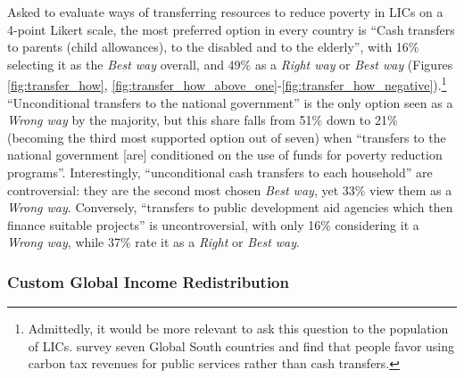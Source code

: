 \documentclass[12pt,english]{article}
\begin{document}
\begin{bibunit}
Asked to evaluate ways of transferring resources to reduce poverty in LICs on a 4-point Likert scale, the most preferred option in every country is ``Cash transfers to parents (child allowances), to the disabled and to the elderly'', with 16\% selecting it as the \textit{Best way} overall, and 49\% as a \textit{Right way} or \textit{Best way} (Figures \ref{fig:transfer_how}, \ref{fig:transfer_how_above_one}-\ref{fig:transfer_how_negative}).\footnote{Admittedly, it would be more relevant to ask this question to the population of LICs. \cite{carson_publics_2025} survey seven Global South countries and find that 
people favor using carbon tax revenues for public services rather than cash
transfers.} ``Unconditional transfers to the national government'' is the only option seen as a \textit{Wrong way} by the majority, but this share falls from 51\% down to 21\% (becoming the third most supported option out of seven) when ``transfers to the national government [are] conditioned on the use of funds for poverty reduction programs''. Interestingly, ``unconditional cash transfers to each household'' are controversial: they are the second most chosen \textit{Best way}, yet 33\% view them as a \textit{Wrong way}. Conversely, ``transfers to public development aid agencies which then finance suitable projects'' is uncontroversial, with only 16\% considering it a \textit{Wrong way}, while 37\% rate it as a \textit{Right} or \textit{Best way}.



\subsubsection{Custom Global Income Redistribution}\label{subsec:custom_redistr}


\end{bibunit}
\end{document}
